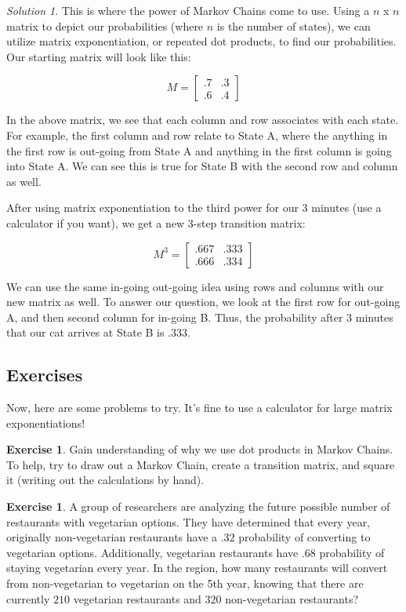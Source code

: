 \documentclass[letterpaper]{article}
\theoremstyle{definition}
\theoremstyle{remark}
\newtheorem*{solution}{Solution}
\theoremstyle{definition}
\newtheorem{exercise}[thm]{Exercise}
\begin{document}
\begin{solution}
This is where the power of Markov Chains come to use. Using a $n$ x $n$ matrix to depict our probabilities (where $n$ is the number of states), we can utilize matrix exponentiation, or repeated dot products, to find our probabilities. Our starting matrix will look like this:

\[
M=
  \begin{bmatrix}
    .7 & .3 \\
    .6 & .4 
  \end{bmatrix}
\]

\noindent
In the above matrix, we see that each column and row associates with each state. For example, the first column and row relate to State A, where the anything in the first row is out-going from State A and anything in the first column is going into State A. We can see this is true for State B with the second row and column as well.

After using matrix exponentiation to the third power for our 3 minutes (use a calculator if you want), we get a new 3-step transition matrix:

\[
M^{3}=
  \begin{bmatrix}
    .667 & .333 \\
    .666 & .334 
  \end{bmatrix}
\]

\noindent
We can use the same in-going out-going idea using rows and columns with our new matrix as well. To answer our question, we look at the first row for out-going A, and then second column for in-going B. Thus, the probability after 3 minutes that our cat arrives at State B is $.333$.
\end{solution}

\subsection*{Exercises}
Now, here are some problems to try. It's fine to use a calculator for large matrix exponentiations!

\begin{exercise}
    Gain understanding of why we use dot products in Markov Chains. To help, try to draw out a Markov Chain, create a transition matrix, and square it (writing out the calculations by hand).
\end{exercise}

\begin{exercise}
    A group of researchers are analyzing the future possible number of restaurants with vegetarian options. They have determined that every year, originally non-vegetarian restaurants have a $.32$ probability of converting to vegetarian options. Additionally, vegetarian restaurants have $.68$ probability of staying vegetarian every year. In the region, how many restaurants will convert from non-vegetarian to vegetarian on the 5th year, knowing that there are currently $210$ vegetarian restaurants and $320$ non-vegetarian restaurants? 
\end{exercise}
\end{document}
